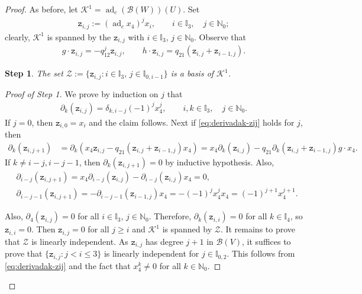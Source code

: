 \documentclass[pdftex]{sigma}
\numberwithin{equation}{section}
\newtheorem{step}{Step}
\newcommand{\adc}{\operatorname{ad}_c}
\newcommand{\toba}{\mathscr B}
\newcommand{\K}{{\mathcal{K}}}
\newcommand{\Zc}{{\mathcal{Z}}}
\newcommand{\I}{{\mathbb I}}
\newcommand{\N}{{\mathbb N}}
\newcommand{\zc}[2]{\mathtt{z}_{#1,#2}}
\begin{document}
\begin{proof}
As before, let $\K^1 =\adc(\toba(W))(U)$.
Set
\begin{align*}%
\zc{i}{j} := (\adc x_{4})^j x_i,\qquad i\in\I_3, \quad j\in\N_0;
\end{align*}
clearly, $\K^1$ is spanned by the $\zc{i}{j}$ with $i\in\I_3$, $ j\in\N_0$. Observe that
\begin{align*}
g\cdot \zc{i}{j} = -q_{12}^j\zc{i}{j}, \qquad
h\cdot \zc{i}{j} = q_{21}(\zc{i}{j}+\zc{i-1}{j}).
\end{align*}

\begin{step}%
The set $\Zc := \{\zc{i}{j}\colon i\in\I_3, \, j\in\I_{0,i-1}\}$ is a basis of $\K^1$.
\end{step}

\begin{proof}[Proof of Step 1]
We prove by induction on $j$ that
\begin{align}\label{eq:derivadak-zij}
\partial_k(\zc{i}{j}) = \delta_{k,i-j} (-1)^j x_{4}^{j}, \qquad i,k\in\I_3, \quad j\in\N_0.
\end{align}
If $j=0$, then $\zc{i}{0}=x_i$ and the claim follows. Next if \eqref{eq:derivadak-zij} holds for $j$, then
\begin{align*}
\partial_k(\zc{i}{j+1})&=\partial_k(x_{4}\zc{i}{j}-q_{21}(\zc{i}{j}+\zc{i-1}{j})x_{4})
=x_{4}\partial_k(\zc{i}{j})-q_{21}\partial_k(\zc{i}{j}+\zc{i-1}{j})g\cdot x_{4}.
\end{align*}
If $k\ne i-j,i-j-1$, then $\partial_k(\zc{i}{j+1})=0$ by inductive hypothesis. Also,
\begin{align*}
&\partial_{i-j}(\zc{i}{j+1})=x_{4}\partial_{i-j}(\zc{i}{j})-\partial_{i-j}(\zc{i}{j})x_{4}=0,
\\
&\partial_{i-j-1}(\zc{i}{j+1})=-\partial_{i-j-1}(\zc{i-1}{j})x_{4}=-(-1)^j x_{4}^{j}x_{4}
=(-1)^{j+1} x_{4}^{j+1}.
\end{align*}

Also, $\partial_{4}(\zc{i}{j})=0$ for all $i\in\I_3$, $j\in\N_0$. Therefore, $\partial_k(\zc{i}{i})=0$ for all $k\in\I_{4}$, so $\zc{i}{i}=0$. Then $\zc{i}{j}=0$ for all $j\ge i$ and $\K^1$ is spanned by $\Zc$.
It remains to prove that $\Zc$ is linearly independent. As $\zc{i}{j}$ has degree $j+1$ in $\toba(V)$, it suffices to prove that $\{\zc{i}{j}\colon j<i\le 3\}$ is linearly independent for $j\in\I_{0,2}$. This follows from \eqref{eq:derivadak-zij} and the fact that $x_{4}^k\ne 0$ for all $k\in\N_0$.
\end{proof}


\end{proof}
\end{document}
